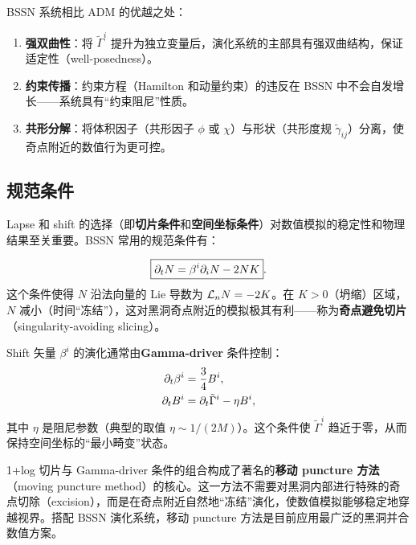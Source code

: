 \begin{property}
    BSSN 系统相比 ADM 的优越之处：
    \begin{enumerate}
        \item \textbf{强双曲性}：将 $\tilde{\Gamma}^i$ 提升为独立变量后，演化系统的主部具有强双曲结构，保证适定性（well-posedness）。
        \item \textbf{约束传播}：约束方程（Hamilton 和动量约束）的违反在 BSSN 中不会自发增长——系统具有“约束阻尼”性质。
        \item \textbf{共形分解}：将体积因子（共形因子 $\phi$ 或 $\chi$）与形状（共形度规 $\tilde{\gamma}_{ij}$）分离，使奇点附近的数值行为更可控。
    \end{enumerate}
\end{property}

\subsection{规范条件}

Lapse 和 shift 的选择（即\textbf{切片条件}和\textbf{空间坐标条件}）对数值模拟的稳定性和物理结果至关重要。BSSN 常用的规范条件有：

\begin{definition}
\begin{equation}
    \boxed{\partial_t N = \beta^i \partial_i N - 2 N K}.
    \label{eq:one_plus_log}
\end{equation}
这个条件使得 $N$ 沿法向量的 Lie 导数为 $\mathcal{L}_n N = -2K$。在 $K>0$（坍缩）区域，$N$ 减小（时间“冻结”），这对黑洞奇点附近的模拟极其有利——称为\textbf{奇点避免切片}（singularity-avoiding slicing）。
\label{def:one_plus_log}
\end{definition}

\begin{definition}
Shift 矢量 $\beta^i$ 的演化通常由\textbf{Gamma-driver} 条件控制：
\begin{align}
    \partial_t \beta^i &= \frac{3}{4} B^i, \label{eq:gamma_driver1} \\
    \partial_t B^i &= \partial_t \tilde{\Gamma}^i - \eta B^i,
    \label{eq:gamma_driver2}
\end{align}
其中 $\eta$ 是阻尼参数（典型的取值 $\eta \sim 1/(2M)$）。这个条件使 $\tilde{\Gamma}^i$ 趋近于零，从而保持空间坐标的“最小畸变”状态。
\label{def:gamma_driver}
\end{definition}

\begin{note}[移动 puncture 方法]
1+log 切片与 Gamma-driver 条件的组合构成了著名的\textbf{移动 puncture 方法}（moving puncture method）的核心。这一方法不需要对黑洞内部进行特殊的奇点切除（excision），而是在奇点附近自然地“冻结”演化，使数值模拟能够稳定地穿越视界。搭配 BSSN 演化系统，移动 puncture 方法是目前应用最广泛的黑洞并合数值方案。
\end{note}

